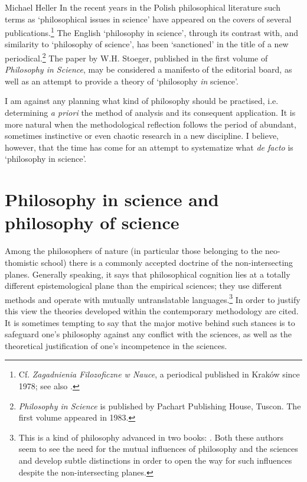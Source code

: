 \begin{artengenv}{Michael Heller}
In the recent years in the Polish philosophical literature such terms as `philosophical issues in science' have
appeared on the covers of several publications.\footnote{Cf. \textit{Zagadnienia Filozoficzne w Nauce}, a periodical
published in Kraków since 1978; see also
\parencite{heller_zagadnienia_1980}.
} The English
`philosophy in science', through its contrast with, and similarity to `philosophy of science', has been `sanctioned' in
the title of a new periodical.\footnote{\textit{Philosophy in Science} is published by Pachart Publishing House,
Tuscon. The first volume appeared in 1983.} The paper by W.H. Stoeger, published in the first volume of
\textit{Philosophy in Science}, may be considered a manifesto of the editorial board, as well as an attempt to provide
a theory of `philosophy \textit{in} science'.\label{heller-stoeger}

I am against any planning what kind of philosophy should be practised, i.e. determining \textit{a priori} the method
of analysis and its consequent application. It is more natural when the methodological reflection follows the period of
abundant, sometimes instinctive or even chaotic research in a new discipline. I believe, however, that the time has
come for an attempt to systematize what \textit{de facto} is `philosophy in science'.\label{heller-defacto}


\section{Philosophy in science and philosophy of science}

Among the philosophers of nature (in particular those belonging to the neo-thomistic school) there is a commonly
accepted doctrine of the non-intersecting planes. Generally speaking, it says that philosophical cognition lies at a
totally different epistemological plane than the empirical sciences; they use different methods and operate with
mutually untranslatable languages.\footnote{This is a kind of philosophy advanced in two books:
	\parencite{mazierski_prolegomena_1969,klosak_z_1980}.
Both these authors seem to see the need for the mutual
influences of philosophy and the sciences and develop subtle distinctions in order to open the way for such influences
despite the non-intersecting planes.} In order to justify this view the theories developed within the contemporary
methodology are cited. It is sometimes tempting to say that the major motive behind such stances is to safeguard one's
philosophy against any conflict with the sciences, as well as the theoretical justification of one's incompetence in
the sciences.


\end{artengenv}
